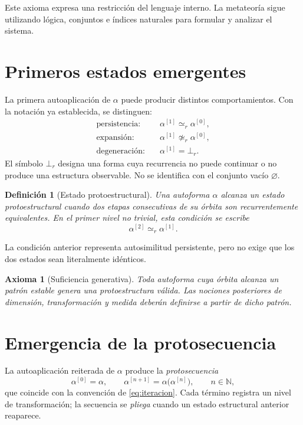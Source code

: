 \documentclass[11pt]{article}
\numberwithin{equation}{section}
\theoremstyle{prism}
\newtheorem{axiomacap}{Axioma}
\newtheorem{defcap}{Definición}
\newcommand{\N}{\mathbb{N}}
\newcommand{\iter}[2]{#1^{[#2]}}
\newcommand{\peq}{\simeq_{\!r}}
\newcommand{\inestable}{\bot_{\!r}}
\begin{document}
Este axioma expresa una restricción del lenguaje interno. La metateoría sigue
utilizando lógica, conjuntos e índices naturales para formular y analizar el
sistema.

\section{Primeros estados emergentes}

La primera autoaplicación de $\alpha$ puede producir distintos comportamientos.
Con la notación ya establecida, se distinguen:
\begin{align}
  \text{persistencia:}
  &\quad \iter{\alpha}{1}\peq\iter{\alpha}{0},
  \label{eq:persistencia}
  \\
  \text{expansión:}
  &\quad \iter{\alpha}{1}\not\peq\iter{\alpha}{0},
  \label{eq:expansion}
  \\
  \text{degeneración:}
  &\quad \iter{\alpha}{1}=\inestable.
  \label{eq:degeneracion}
\end{align}
El símbolo $\inestable$ designa una forma cuya recurrencia no puede continuar o
no produce una estructura observable. No se identifica con el conjunto vacío
$\varnothing$.

\begin{defcap}[Estado protoestructural]
Una autoforma $\alpha$ alcanza un estado protoestructural cuando dos etapas
consecutivas de su órbita son recurrentemente equivalentes. En el primer nivel
no trivial, esta condición se escribe
\begin{equation}
  \iter{\alpha}{2}\peq\iter{\alpha}{1}.
  \label{eq:estado-protoestructural}
\end{equation}
\end{defcap}

La condición anterior representa autosimilitud persistente, pero no exige que
los dos estados sean literalmente idénticos.

\begin{axiomacap}[Suficiencia generativa]
Toda autoforma cuya órbita alcanza un patrón estable genera una protoestructura
válida. Las nociones posteriores de dimensión, transformación y medida deberán
definirse a partir de dicho patrón.
\end{axiomacap}

\section{Emergencia de la protosecuencia}

La autoaplicación reiterada de $\alpha$ produce la \emph{protosecuencia}
\begin{equation}
  \iter{\alpha}{0}=\alpha,
  \qquad
  \iter{\alpha}{n+1}
  =\alpha\bigl(\iter{\alpha}{n}\bigr),
  \qquad n\in\N,
  \label{eq:protosecuencia-cap}
\end{equation}
que coincide con la convención de \eqref{eq:iteracion}. Cada término registra
un nivel de transformación; la secuencia se \emph{pliega} cuando un estado
estructural anterior reaparece.
\end{document}
